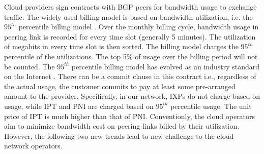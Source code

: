 

Cloud providers sign contracts with BGP peers for bandwidth usage to exchange traffic. The widely used billing model is based on bandwidth utilization, i.e. the $95^{th}$ percentile billing model \cite{hong2013achieving}. Over the monthly billing cycle, bandwidth usage in peering link is recorded for every time slot (generally 5 minutes). 
The utilization of megabits in every time slot is then sorted. The billing model charges the $95^{th}$ percentile of the utilizations. The top 5\% of usage over the billing period will not be counted. The $95^{th}$ percentile billing model has evolved as an industry standard on the Internet \cite{singh2021costCascara}. There can be a commit clause in this contract i.e., regardless of the actual usage, the customer commits to pay at least some pre-arranged amount to the provider. Specifically, in our network, IXPs do not charge based on usage, while IPT and PNI are charged based on $95^{th}$ percentile usage. The unit price of IPT is much higher than that of PNI. Conventionly, the cloud operators aim to minimize bandwidth cost on peering links billed by their utilization. However, the following two new trends lead to new challenge to the cloud network operators.


